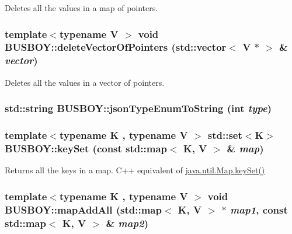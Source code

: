 Deletes all the values in a map of pointers. \hypertarget{namespaceBUSBOY_a31674a02d5b0c7247036251b9ddfb446}{
\subsubsection[{deleteVectorOfPointers}]{\setlength{\rightskip}{0pt plus 5cm}template$<$typename V $>$ void BUSBOY::deleteVectorOfPointers (std::vector$<$ V $\ast$ $>$ \& {\em vector})}}
\label{namespaceBUSBOY_a31674a02d5b0c7247036251b9ddfb446}


Deletes all the values in a vector of pointers. \hypertarget{namespaceBUSBOY_a85e2c1eb3640b9f6f7a21a3992dfd900}{
\subsubsection[{jsonTypeEnumToString}]{\setlength{\rightskip}{0pt plus 5cm}std::string BUSBOY::jsonTypeEnumToString (int {\em type})}}
\label{namespaceBUSBOY_a85e2c1eb3640b9f6f7a21a3992dfd900}
\hypertarget{namespaceBUSBOY_a532e2d36284b7d18c06080572130098e}{
\subsubsection[{keySet}]{\setlength{\rightskip}{0pt plus 5cm}template$<$typename K , typename V $>$ std::set$<$K$>$ BUSBOY::keySet (const std::map$<$ K, V $>$ \& {\em map})}}
\label{namespaceBUSBOY_a532e2d36284b7d18c06080572130098e}


Returns all the keys in a map. C++ equivalent of \hyperlink{namespaceBUSBOY_a532e2d36284b7d18c06080572130098e}{java.util.Map.keySet()} \hypertarget{namespaceBUSBOY_ab648989876ee1856c8eb27d39f7c5497}{
\subsubsection[{mapAddAll}]{\setlength{\rightskip}{0pt plus 5cm}template$<$typename K , typename V $>$ void BUSBOY::mapAddAll (std::map$<$ K, V $>$ $\ast$ {\em map1}, \/  const std::map$<$ K, V $>$ \& {\em map2})}}
\label{namespaceBUSBOY_ab648989876ee1856c8eb27d39f7c5497}



